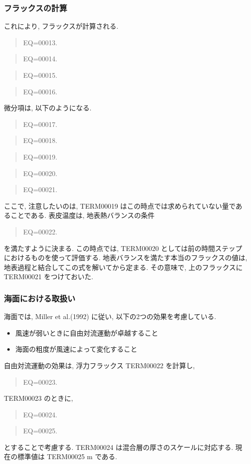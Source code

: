 \subsubsection{フラックスの計算}

これにより, フラックスが計算される.
%
\begin{quote}
EQ=00013.
\end{quote}
\begin{quote}
EQ=00014.
\end{quote}
\begin{quote}
EQ=00015.
\end{quote}
\begin{quote}
EQ=00016.
\end{quote}

微分項は, 以下のようになる.
\begin{quote}
EQ=00017.
\end{quote}
\begin{quote}
EQ=00018.
\end{quote}
\begin{quote}
EQ=00019.
\end{quote}
\begin{quote}
EQ=00020.
\end{quote}
\begin{quote}
EQ=00021.
\end{quote}

ここで, 注意したいのは,
TERM00019 はこの時点では求められていない量であることである.
表皮温度は, 
地表熱バランスの条件
\begin{quote}
EQ=00022.
\end{quote}
を満たすように決まる.
この時点では, TERM00020 としては前の時間ステップにおけるものを使って評価する.
地表バランスを満たす本当のフラックスの値は,
地表過程と結合してこの式を解いてから定まる.
その意味で, 上のフラックスに TERM00021 をつけておいた.

\subsubsection{海面における取扱い}

海面では, Miller et al.(1992) に従い, 以下の2つの効果を考慮している.
\begin{itemize}
\item 風速が弱いときに自由対流運動が卓越すること
\item 海面の粗度が風速によって変化すること
\end{itemize}

自由対流運動の効果は, 浮力フラックス TERM00022 を計算し,
\begin{quote}
EQ=00023.
\end{quote}
TERM00023 のときに,
\begin{quote}
EQ=00024.
\end{quote}
\begin{quote}
EQ=00025.
\end{quote}
とすることで考慮する.  TERM00024 は混合層の厚さのスケールに対応する.
現在の標準値は TERM00025 m である.

